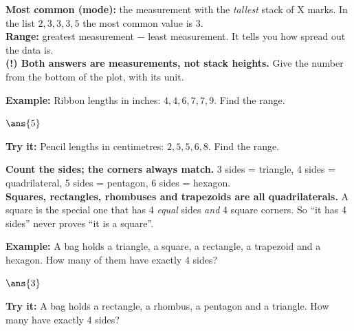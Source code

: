 \documentclass[12pt]{article}
\begin{document}
\begin{formulabox}
\textbf{Most common (mode):} the measurement with the \emph{tallest} stack of
X marks. In the list $2, 3, 3, 3, 5$ the most common value is $3$.\\[3pt]
\textbf{Range:} greatest measurement $-$ least measurement. It tells you how
spread out the data is.\\[3pt]
\textbf{(!) Both answers are measurements, not stack heights.} Give the number
from the bottom of the plot, with its unit.
\end{formulabox}
\begin{examplebox}
\textbf{Example:} Ribbon lengths in inches: $4, 4, 6, 7, 7, 9$. Find the range.
\par
$\ans{5}$
\end{examplebox}
\begin{tryitbox}
\textbf{Try it:} Pencil lengths in centimetres: $2, 5, 5, 6, 8$. Find the
range.\\[2pt]
\end{tryitbox}

\begin{formulabox}
\textbf{Count the sides; the corners always match.} 3 sides = triangle,
4 sides = quadrilateral, 5 sides = pentagon, 6 sides = hexagon.\\[3pt]
\textbf{Squares, rectangles, rhombuses and trapezoids are all quadrilaterals.}
A square is the special one that has 4 \emph{equal} sides \emph{and} 4 square
corners. So ``it has 4 sides'' never proves ``it is a square''.
\end{formulabox}
\begin{examplebox}
\textbf{Example:} A bag holds a triangle, a square, a rectangle, a trapezoid
and a hexagon. How many of them have exactly 4 sides?
\par
$\ans{3}$
\end{examplebox}
\begin{tryitbox}
\textbf{Try it:} A bag holds a rectangle, a rhombus, a pentagon and a
triangle. How many have exactly 4 sides?\\[2pt]
\end{tryitbox}
\end{document}
